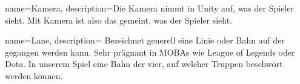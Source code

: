 {
  name={Kamera},
  description={Die Kamera nimmt in Unity auf, was der Spieler sieht.
  Mit Kamera ist also das gemeint, was der Spieler sieht.}
}

{
  name={Lane},
  description={
    Bezeichnet generell eine Linie oder Bahn auf der gegangen werden kann.
    Sehr prägnant in MOBAs wie League of Legends oder Dota.
    In unserem Spiel eine Bahn der vier, auf welcher Truppen beschwört werden können.}
}



